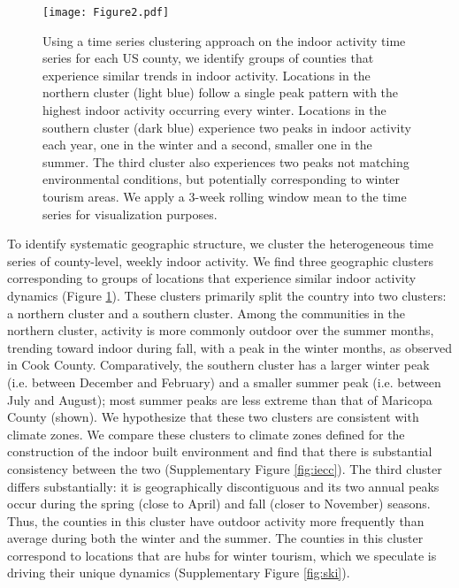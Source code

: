 \documentclass{article}
\begin{document}
\begin{figure}
    \centering
    \texttt{[image: Figure2.pdf]}
    \caption{Using a time series clustering approach on the indoor activity time series for each US county, we identify groups of counties that experience similar trends in indoor activity. Locations in the northern cluster (light blue) follow a single peak pattern with the highest indoor activity occurring every winter. Locations in the southern cluster (dark blue) experience two peaks in indoor activity each year, one in the winter and a second, smaller one in the summer. The third cluster also experiences two peaks not matching environmental conditions, but potentially corresponding to winter tourism areas. We apply a 3-week rolling window mean to the time series for visualization purposes.}
    \label{fig:clustermap}
\end{figure}

To identify systematic geographic structure, we cluster the heterogeneous time series of county-level, weekly indoor activity. We find three geographic clusters corresponding to groups of locations that experience similar indoor activity dynamics (Figure \ref{fig:clustermap}). These clusters primarily split the country into two clusters: a northern cluster and a southern cluster. Among the communities in the northern cluster, activity is more commonly outdoor over the summer months, trending toward indoor during fall, with a peak in the winter months, as observed in Cook County. Comparatively, the southern cluster has a larger winter peak (i.e. between December and February) and a smaller summer peak (i.e. between July and August); most summer peaks are less extreme than that of Maricopa County (shown). %
We hypothesize that these two clusters are consistent with climate zones. We compare these clusters to climate zones defined for the construction of the indoor built environment and find that there is substantial consistency between the two (Supplementary Figure \ref{fig:iecc}).
The third cluster differs substantially: it is geographically discontiguous and its two annual peaks occur during the spring (close to April) and fall (closer to November) seasons. Thus, the counties in this cluster have outdoor activity more frequently than average during both the winter and the summer. The counties in this cluster correspond to locations that are hubs for winter tourism, which we speculate is driving their unique dynamics (Supplementary Figure \ref{fig:ski}).
\end{document}
